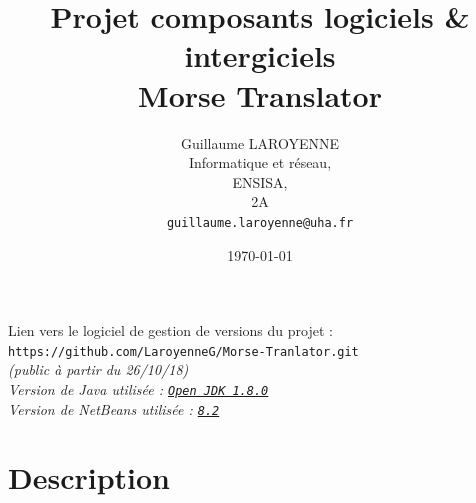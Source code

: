 \documentclass[a4paper,11pt]{article}
\title{\LARGE{Projet composants logiciels \& intergiciels}\\\bigskip \textbf{Morse Translator}}
\author{Guillaume LAROYENNE\\
Informatique et réseau,\\
ENSISA,\\
2A\\
\bigskip
\texttt{guillaume.laroyenne@uha.fr}
}
\date{\today}
\begin{document}
    \maketitle
    \vspace{2cm}
    \begin{center}
        \large{Lien vers le logiciel de gestion de versions du projet :} \texttt{https://github.com/LaroyenneG/Morse-Tranlator.git} \\
        \small{\textit{(public à partir du 26/10/18)}}
        \\[2cm]
        \textit{Version de Java utilisée : \texttt{\underline{Open JDK 1.8.0}}}\\
        \textit{Version de NetBeans utilisée : \texttt{\underline{8.2}}}
    \end{center}

    \newpage

    \tableofcontents

    \newpage

    \section{Description}
\end{document}
